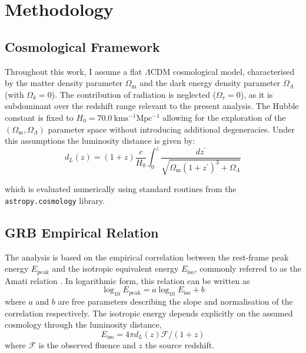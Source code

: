 \documentclass[
    aps,
    prd,
    twocolumn,
    nofootinbib,
    floatfix,
    superscriptaddress
]{revtex4-2}
\newcommand{\Om}{\Omega_{\mathrm{m}}}
\newcommand{\Ol}{\Omega_\Lambda}
\newcommand{\Ep}{E_\mathrm{peak}}
\newcommand{\Ei}{E_\mathrm{iso}}
\begin{document}
\section{Methodology}\label{sec:methodology}

\subsection{Cosmological Framework}

Throughout this work, I assume a flat $\Lambda$CDM cosmological model, characterised by the matter density parameter $\Om$ and the dark energy density parameter $\Ol$ (with $\Omega_k = 0$). The contribution of radiation is neglected ($\Omega_r = 0$), as it is subdominant over the redshift range relevant to the present analysis. The Hubble constant is fixed to $H_0 = 70.0\ \mathrm{km s^{-1} Mpc^{-1}}$ allowing for the exploration of the $(\Om, \Omega_\Lambda)$ parameter space without introducing additional degeneracies. Under this assumptions the luminosity distance is given by:
\begin{equation}
    d_L (z) = (1+z)\frac{c}{H_0} \int_0 ^z \frac{dz^\prime}{\sqrt{\Om(1+z^\prime)^3+\Omega_\Lambda}}
\end{equation}

which is evaluated numerically using standard routines from the \verb|astropy.cosmology| library.

\subsection{GRB Empirical Relation}

The analysis is based on the empirical correlation between the rest-frame peak energy $\Ep$ and the isotropic equivalent energy $\Ei$, commonly referred to as the Amati relation \cite{ghirlanda_2006}. In logarithmic form, this relation can be written as
\begin{equation}
    \log_{10} \Ep = a \log_{10} \Ei + b
\end{equation}
where $a$ and $b$ are free parameters describing the slope and normalisation of the correlation respectively. The isotropic energy depends explicitly on the assumed cosmology through the luminosity distance,
\begin{equation}
    \Ei = 4\pi d_L(z) \mathcal{F}/(1+z)
\end{equation}
where $\mathcal{F}$ is the observed fluence and $z$ the source redshift.
\end{document}
